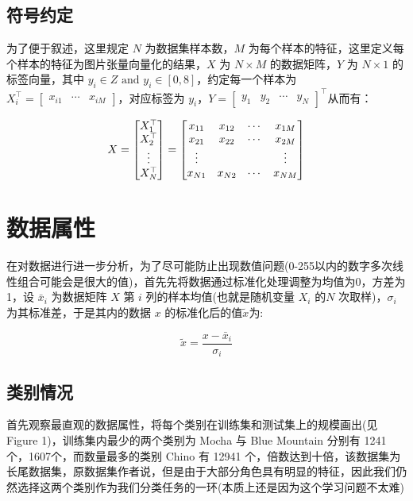 \documentclass[fleqn]{Paquetes/RevDigMatEduInt}
\begin{document}
\subsection{符号约定}

为了便于叙述，这里规定 $N$ 为数据集样本数，$M$ 为每个样本的特征，这里定义每个样本的特征为图片张量向量化的结果，$X$ 为 $N \times M$ 的数据矩阵，$Y$ 为 $N \times 1$ 的标签向量，其中 $y_i \in Z \mbox{ and } y_i \in [0,8]$，约定每一个样本为 $X_i^\top = \begin{bmatrix}x_{i1} & \cdots & x_{iM}\end{bmatrix}$，对应标签为 $y_i$，$Y = \begin{bmatrix}y_1&y_2& \cdots & y_N \end{bmatrix}^\top$从而有：

\begin{align}
	X = \begin{bmatrix}
		X_1^\top \\ X_2^\top \\\vdots \\ X_N^\top 
	\end{bmatrix} = \begin{bmatrix}
	x_{11} & x_{12} & \cdots & x_{1M}\\
	x_{21} & x_{22} & \cdots & x_{2M} \\
	\vdots & & &\vdots\\
	x_{N1} & x_{N2} & \cdots & x_{NM}\notag
	\end{bmatrix} 
\end{align}


\section{数据属性}

在对数据进行进一步分析，为了尽可能防止出现数值问题(0-255以内的数字多次线性组合可能会是很大的值)，首先先将数据通过标准化处理调整为均值为0，方差为1，设 $\bar{x}_i$ 为数据矩阵 $X$ 第 $i$ 列的样本均值(也就是随机变量 $X_i$ 的$N$ 次取样)，$\sigma_i$ 为其标准差，于是其内的数据 $x$ 的标准化后的值$\tilde{x}$为:

$$
\tilde{x} = \frac{x - \bar{x}_i}{\sigma_i}
$$

\subsection{类别情况}

首先观察最直观的数据属性，将每个类别在训练集和测试集上的规模画出(见 Figure 1)，训练集内最少的两个类别为 Mocha 与 Blue Mountain 分别有 1241个，1607个，而数量最多的类别 Chino 有 12941 个，倍数达到十倍，该数据集为长尾数据集，原数据集作者说，但是由于大部分角色具有明显的特征，因此我们仍然选择这两个类别作为我们分类任务的一环(本质上还是因为这个学习问题不太难)
\end{document}
